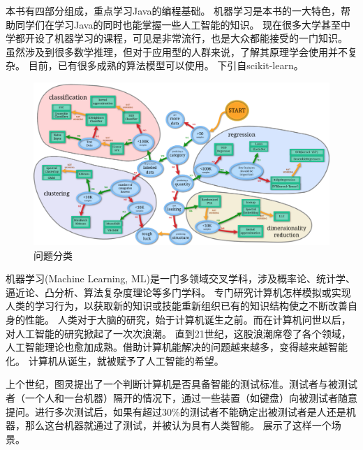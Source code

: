 

本书有四部分组成，重点学习Java的编程基础。
机器学习是本书的一大特色，帮助同学们在学习Java的同时也能掌握一些人工智能的知识。
现在很多大学甚至中学都开设了机器学习的课程，可见是非常流行，也是大众都能接受的一门知识。
虽然涉及到很多数学推理，但对于应用型的人群来说，了解其原理学会使用并不复杂。
目前，已有很多成熟的算法模型可以使用。
下引自scikit-learn。

\begin{figure}[!htb]
	\centerline{\includegraphics[width=.5\figwidth]{images/scikit-algo.png}}
	\caption{问题分类}
	\label{fig:part1_scikit_algo}
\end{figure}

机器学习(Machine Learning, ML)是一门多领域交叉学科，涉及概率论、统计学、逼近论、凸分析、算法复杂度理论等多门学科。
专门研究计算机怎样模拟或实现人类的学习行为，以获取新的知识或技能重新组织已有的知识结构使之不断改善自身的性能。
人类对于大脑的研究，始于计算机诞生之前。而在计算机问世以后，对人工智能的研究掀起了一次次浪潮。
直到21世纪，这股浪潮席卷了各个领域，人工智能理论也愈加成熟。借助计算机能解决的问题越来越多，变得越来越智能化。
计算机从诞生，就被赋予了人工智能的希望。

上个世纪，图灵提出了一个判断计算机是否具备智能的测试标准。测试者与被测试者（一个人和一台机器）隔开的情况下，通过一些装置（如键盘）向被测试者随意提问。进行多次测试后，如果有超过30\%的测试者不能确定出被测试者是人还是机器，那么这台机器就通过了测试，并被认为具有人类智能。
展示了这样一个场景。


